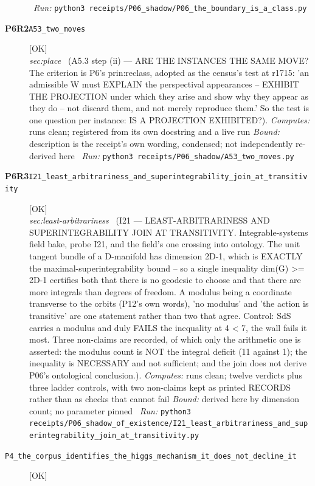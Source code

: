 \begin{description}
\ \emph{Run:} \texttt{python3 receipts/P06\_shadow/P06\_the\_boundary\_is\_a\_class.py}
\item[\rcptlabel{A53_two_moves}{P6R2}\textbf{P6R2}\quad\texttt{A53\_two\_moves}]\hfill\textsf{[OK]}\\
\textit{sec:place} \ (A5.3 step (ii) --- ARE THE INSTANCES THE SAME MOVE? The criterion is P6's prin:reclass, adopted as the census's test at r1715: 'an admissible W must EXPLAIN the perspectival appearances -- EXHIBIT THE PROJECTION under which they arise and show why they appear as they do -- not discard them, and not merely reproduce them.' So the test is one question per instance: IS A PROJECTION EXHIBITED?). 
\emph{Computes:} runs clean; registered from its own docstring and a live run
 \emph{Bound:} description is the receipt's own wording, condensed; not independently re-derived here
\ \emph{Run:} \texttt{python3 receipts/P06\_shadow/A53\_two\_moves.py}
\item[\rcptlabel{I21_least_arbitrariness_and_superintegrability_join_at_transitivity}{P6R3}\textbf{P6R3}\quad\texttt{I21\_least\_arbitrariness\_and\_superintegrability\_join\_at\_transitivity}]\hfill\textsf{[OK]}\\
\textit{sec:least-arbitrariness} \ (I21 --- LEAST-ARBITRARINESS AND SUPERINTEGRABILITY JOIN AT TRANSITIVITY. Integrable-systems field bake, probe I21, and the field's one crossing into ontology. The unit tangent bundle of a D-manifold has dimension 2D-1, which is EXACTLY the maximal-superintegrability bound -- so a single inequality dim(G) >= 2D-1 certifies both that there is no geodesic to choose and that there are more integrals than degrees of freedom. A modulus being a coordinate transverse to the orbits (P12's own words), 'no modulus' and 'the action is transitive' are one statement rather than two that agree. Control: SdS carries a modulus and duly FAILS the inequality at 4 < 7, the wall fails it most. Three non-claims are recorded, of which only the arithmetic one is asserted: the modulus count is NOT the integral deficit (11 against 1); the inequality is NECESSARY and not sufficient; and the join does not derive P06's ontological conclusion.). 
\emph{Computes:} runs clean; twelve verdicts plus three ladder controls, with two non-claims kept as printed RECORDS rather than as checks that cannot fail
 \emph{Bound:} derived here by dimension count; no parameter pinned
\ \emph{Run:} \texttt{python3 receipts/P06\_shadow\_of\_existence/I21\_least\_arbitrariness\_and\_superintegrability\_join\_at\_transitivity.py}
\item[\label{rcpt:P4_the_corpus_identifies_the_higgs_mechanism_it_does_not_decline_it}\textbf{}\quad\texttt{P4\_the\_corpus\_identifies\_the\_higgs\_mechanism\_it\_does\_not\_decline\_it}]\hfill\textsf{[OK]}\\

\end{description}
